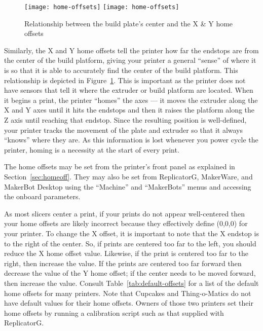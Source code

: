 \begin{figure}[!htbp]
  \centering
    \ifpdf
       \texttt{[image: home-offsets]}
    \else
       \texttt{[image: home-offsets]}
    \fi
    \caption{Relationship between the build plate's center and the X \& Y home offsets}
  \label{fig:xy-home-offsets}
\end{figure}

Similarly, the X and Y home offsets tell the printer how far the endstops are from the center of the build platform, giving your printer a general ``sense'' of where it is so that it is able to accurately find the center of the build platform.   This relationship is depicted in  Figure~\ref{fig:xy-home-offsets}. This is important as the printer does not have sensors that tell it where the extruder or build platform are located.  When it begins a print, the printer ``homes'' the axes --- it moves the extruder along the X and Y axes until it hits the endstops and then it raises the platform along the Z axis until reaching that endstop.  Since the resulting position is well-defined, your printer tracks the movement of the plate and extruder so that it always ``knows'' where they are.  As this information is lost whenever you power cycle the printer, homing is a necessity at the start of every print.

The home offsets may be set from the printer's front panel as explained in Section~\ref{sec:homeoff}.  They may also be set from ReplicatorG, MakerWare, and MakerBot Desktop using the ``Machine'' and ``MakerBots'' menus and accessing the onboard parameters.

As most \glspl{slicer} center a print, if your prints do not appear well-centered then your home offsets are likely incorrect because they effectively define (0,0,0) for your printer.   To change the X offset, it is important to note that the X endstop is to the right of the center.  So, if prints are centered too far to the left, you should reduce the X home offset value.  Likewise, if the print is centered too far to the right, then increase the value.  If the prints are centered too far forward then decrease the value of the Y home offset; if the center needs to be moved forward, then increase the value.  Consult Table~\ref{tab:default-offsets} for a list of the default home offsets for many printers.  Note that Cupcakes and Thing-o-Matics do not have default values for their home offsets.  Owners of those two printers set their home offsets by running a calibration script such as that supplied with ReplicatorG.

